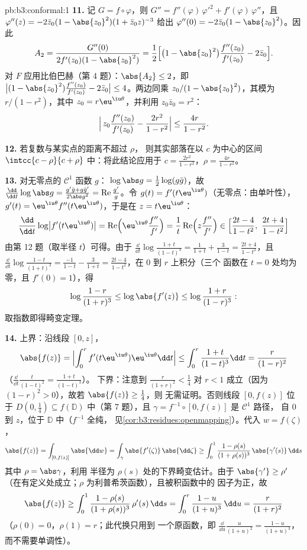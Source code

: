 \begin{solution}{pb:b3:conformal:1}
\textbf{11.} 记 $G = f\circ\varphi$，则 $G'' =
f''(\varphi)\,\varphi'^2 + f'(\varphi)\,\varphi''$，且
$\varphi''(z) = -2\bar z_0(1 - \abs{z_0}^2)(1 + \bar
z_0z)^{-3}$ 给出 $\varphi''(0) = -2\bar z_0(1 -
\abs{z_0}^2)$。因此
\[
A_2 = \frac{G''(0)}{2f'(z_0)(1 - \abs{z_0}^2)}
= \frac12\Bigl[\bigl(1 - \abs{z_0}^2\bigr)
\frac{f''(z_0)}{f'(z_0)} - 2\bar z_0\Bigr] .
\]
对 $F$ 应用比伯巴赫（第 4 题）：$\abs{A_2} \leq 2$，即
$\bigl|(1 - \abs{z_0}^2)\frac{f''(z_0)}{f'(z_0)} - 2\bar
z_0\bigr| \leq 4$。两边同乘
$z_0/(1 - \abs{z_0}^2)$，其模为
$r/(1 - r^2)$，其中 $z_0 = r\eu^{\iu\theta}$，并利用 $z_0\bar
z_0 = r^2$：
\[
\Bigl|\,z_0\frac{f''(z_0)}{f'(z_0)} -
\frac{2r^2}{1 - r^2}\Bigr| \leq \frac{4r}{1 - r^2} .
\]

\textbf{12.} 若复数与某实点的距离不超过 $\rho$，
则其实部落在以 $c$ 为中心的区间 $\intcc{c - \rho}{c +
\rho}$ 中：将此结论应用于 $c = \frac{2r^2}{1-r^2}$，$\rho =
\frac{4r}{1-r^2}$。

\textbf{13.} 对无零点的 $\mathcal C^1$ 函数 $g$：
$\log\abs g = \frac12\log(g\bar g)$，故 $\frac{\dd}{\dd
t}\log\abs g = \frac{g'\bar g + g\bar g'}{2\abs g^2} =
\operatorname{Re}\frac{g'}g$。令 $g(t) =
f'(t\eu^{\iu\theta})$（无零点：由单叶性），$g'(t) =
\eu^{\iu\theta}f''(t\eu^{\iu\theta})$，于是在 $z =
t\eu^{\iu\theta}$：
\[
\frac{\dd}{\dd t}\log\bigl|f'(t\eu^{\iu\theta})\bigr|
= \operatorname{Re}\Bigl(\eu^{\iu\theta}
\frac{f''}{f'}\Bigr)
= \frac1t\operatorname{Re}\Bigl(z\frac{f''}{f'}\Bigr)
\in \Bigl[\frac{2t - 4}{1 - t^2},\
\frac{2t + 4}{1 - t^2}\Bigr]
\]
由第 12 题（取半径 $t$）可得。由于 $\frac{\dd}{\dd
t}\log\frac{1+t}{(1-t)^3} = \frac1{1+t} + \frac3{1-t} =
\frac{2t+4}{1-t^2}$，且 $\frac{\dd}{\dd
t}\log\frac{1-t}{(1+t)^3} = \frac{-1}{1-t} - \frac3{1+t} =
\frac{2t-4}{1-t^2}$，在 $0$ 到 $r$ 上积分（三个
函数在 $t = 0$ 处均为零，且 $f'(0) = 1$），得
\[
\log\frac{1-r}{(1+r)^3} \leq \log\abs{f'(z)} \leq
\log\frac{1+r}{(1-r)^3} :
\]
取指数即得畸变定理。

\textbf{14.} 上界：沿线段 $[0, z]$，
\[
\abs{f(z)} = \Bigl|\int_0^rf'(t\eu^{\iu\theta})
\eu^{\iu\theta}\dd t\Bigr|
\leq \int_0^r\frac{1+t}{(1-t)^3}\dd t
= \frac{r}{(1-r)^2}
\]
（$\frac{\dd}{\dd t}\frac t{(1-t)^2} = \frac{1+t}{(1-t)^3}$）。
下界：注意到 $\frac r{(1+r)^2} < \frac14$ 对 $r < 1$ 成立（因为
$(1-r)^2 > 0$），故若 $\abs{f(z)} \geq \frac14$，则
无需证明。否则线段 $[0, f(z)]$ 位于
$D(0, \frac14) \subseteq f(\mathbb D)$ 中（第 7 题），且
$\gamma = f^{-1}\circ[0, f(z)]$ 是 $\mathcal C^1$ 路径，
自 $0$ 到 $z$，位于 $\mathbb D$ 中（$f^{-1}$ 全纯，
见\cref{cor:b3:residues:openmapping}）。代入 $w =
f(\zeta)$，
\[
\abs{f(z)} = \int_{[0,f(z)]}\abs{\dd w}
= \int_\gamma\abs{f'(\zeta)}\,\abs{\dd\zeta}
\geq \int_0^1\frac{1 - \rho(s)}{(1 + \rho(s))^3}
\,\abs{\gamma'(s)}\,\dd s
\]
其中 $\rho = \abs\gamma$，利用
半径为 $\rho(s)$ 处的下界畸变估计。由于 $\abs{\gamma'} \geq \rho'$
（在有定义处成立；$\rho$ 为利普希茨函数），且被积函数中的
因子为正，故
\[
\abs{f(z)} \geq \int_0^1
\frac{1 - \rho(s)}{(1 + \rho(s))^3}\,\rho'(s)\,\dd s
= \int_0^{r}\frac{1 - u}{(1 + u)^3}\,\dd u
= \frac{r}{(1 + r)^2}
\]
（$\rho(0) = 0$，$\rho(1) = r$；此代换只用到
一个原函数，即 $\frac{\dd}{\dd u}\frac u{(1+u)^2} =
\frac{1-u}{(1+u)^3}$，而不需要单调性）。


\end{solution}
